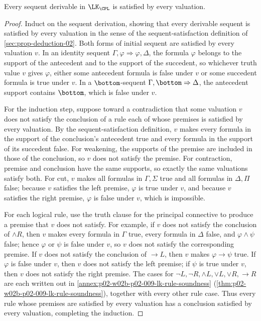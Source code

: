 \begin{theorem}
\label{thm:prop-lk-soundness}
Every sequent derivable in \(\LK_{\CPL}\) is satisfied by every valuation.
\end{theorem}
\begin{proof}
Induct on the sequent derivation, showing that every derivable sequent is
satisfied by every valuation in the sense of the sequent-satisfaction
definition of \cref{sec:prop-deduction-02}.  Both forms of initial sequent
are satisfied by every valuation \(v\).  In an identity sequent
\(\Gamma,\varphi\Rightarrow\varphi,\Delta\), the formula \(\varphi\)
belongs to the support of the antecedent and to the support of the
succedent, so whichever truth value \(v\) gives \(\varphi\), either some
antecedent formula is false under \(v\) or some succedent formula is true
under \(v\).  In a \(\bottom\)-sequent
\(\Gamma,\bottom\Rightarrow\Delta\), the antecedent support contains
\(\bottom\), which is false under \(v\).

For the induction step, suppose toward a contradiction that some valuation
\(v\) does not satisfy the conclusion of a rule each of whose premises is
satisfied by every valuation.  By the sequent-satisfaction definition,
\(v\) makes every formula in the support of the conclusion's antecedent
true and every formula in the support of its succedent false.  For
weakening, the supports of the premise are included in those of the
conclusion, so \(v\) does not satisfy the premise.  For contraction,
premise and conclusion have the same supports, so exactly the same
valuations satisfy both.  For cut, \(v\) makes all formulas in
\(\Gamma,\Sigma\) true and all formulas in \(\Delta,\Pi\) false; because
\(v\) satisfies the left premise, \(\varphi\) is true under \(v\), and
because \(v\) satisfies the right premise, \(\varphi\) is false under
\(v\), which is impossible.

For each logical rule, use the truth clause for the principal connective to
produce a premise that \(v\) does not satisfy.  For example, if \(v\)
does not satisfy the conclusion of \(\land R\), then \(v\) makes every
formula in \(\Gamma\) true, every formula in \(\Delta\) false, and
\(\varphi\land\psi\) false; hence \(\varphi\) or \(\psi\) is false under
\(v\), so \(v\) does not satisfy the corresponding premise.  If \(v\)
does not satisfy the conclusion of \(\to L\), then \(v\) makes
\(\varphi\to\psi\) true.  If \(\varphi\) is false under \(v\), then
\(v\) does not satisfy the left premise; if \(\psi\) is true under
\(v\), then \(v\) does not satisfy the right premise.  The cases for
\(\neg L,\neg R,\land L,\lor L,\lor R,\to R\) are each written out in
\cref{annex:p02-w02b-p02-009-lk-rule-soundness}
(\cref{thm:p02-w02b-p02-009-lk-rule-soundness}), together with every other
rule case.  Thus every rule whose
premises are satisfied by every valuation has a conclusion satisfied by
every valuation, completing the induction.
\end{proof}

